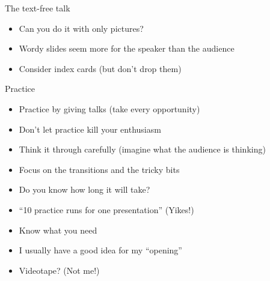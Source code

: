 \documentclass[12pt]{article}
\newcommand{\headsize}{\fontsize{35}{35} \selectfont}
\newcommand{\smallsize}{\fontsize{25}{30} \selectfont}
\newcommand{\smallersize}{\fontsize{20}{25} \selectfont}
\begin{document}
\newpage

\headsize \color{myyellow}
\hfill \begin{minipage}{5.75in}
\centering
The text-free talk
\end{minipage}

\vspace{3cm} \color{mywhite} \smallsize

\hfill \begin{minipage}{9.5in}

\begin{itemize}
\itemsep18pt
\item Can you do it with only pictures?

\item Wordy slides seem more for the speaker than the audience

\item Consider index cards {\color{myblue} \smallersize (but don't
    drop them)}
\end{itemize}
\end{minipage}


\newpage

\headsize \color{myyellow}
\hfill \begin{minipage}{5.75in}
\centering
Practice
\end{minipage}

\vspace{15mm} \color{mywhite} \smallsize

\hfill \begin{minipage}{9.5in}

\begin{itemize}
\itemsep18pt
\item Practice by giving talks {\color{myblue} \smallersize (take
    every opportunity)}

\item Don't let practice kill your enthusiasm

\item Think it through carefully {\color{myblue} \smallersize (imagine what the audience is thinking)}

\item Focus on the transitions and the tricky bits

\item Do you know how long it will take?

\item ``10 practice runs for one presentation''  {\color{mypink} (Yikes!)}

\item Know what {\color{mypink} you} need

\item I usually have a good idea for my ``opening''

\item Videotape? {\color{mypink} (Not me!)}

\end{itemize}

\end{minipage}
\end{document}
